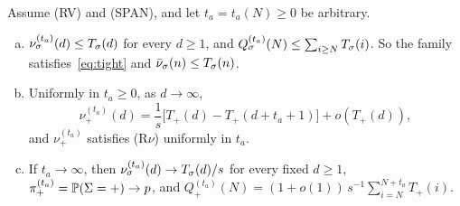 \begin{lemma}\label{lem:aged-nu}
Assume (RV) and (SPAN), and let $t_a=t_a(N)\ge0$ be arbitrary.
\begin{enumerate}[(a)]
\item $\nu^{(t_a)}_\sigma(d)\le T_\sigma(d)$ for every $d\ge1$, and
$Q^{(t_a)}_\sigma(N)\le\sum_{i\ge N}T_\sigma(i)$. So the family satisfies~\eqref{eq:tight} and
$\bar\nu_\sigma(n)\le T_\sigma(n)$.
\item Uniformly in $t_a\ge0$, as $d\to\infty$,
\[
 \nu^{(t_a)}_\plus(d)=\frac1s\bigl[T_\plus(d)-T_\plus(d+t_a+1)\bigr]+o(T_\plus(d)),
\]
and $\nu^{(t_a)}_\plus$ satisfies (R$\nu$) uniformly in $t_a$.
\item If $t_a\to\infty$, then $\nu^{(t_a)}_\sigma(d)\to T_\sigma(d)/s$ for every fixed $d\ge1$,
$\pi^{(t_a)}_{+}=\mathbb{P}(\Sigma={+})\to p$, and
$Q^{(t_a)}_\plus(N)=(1+o(1))\,s^{-1}\sum_{i=N}^{N+t_a}T_\plus(i)$.
\end{enumerate}
\end{lemma}

